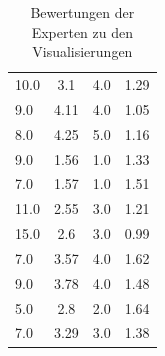 \begin{table}[htbp]
\begin{tabularx}{1.3\textwidth}{|X|c|c|c|}
        10.0 & 3.1 & 4.0 & 1.29 \\
        9.0 & 4.11 & 4.0 & 1.05 \\
        8.0 & 4.25 & 5.0 & 1.16 \\
        9.0 & 1.56 & 1.0 & 1.33 \\
        7.0 & 1.57 & 1.0 & 1.51 \\
        11.0 & 2.55 & 3.0 & 1.21 \\
        15.0 & 2.6 & 3.0 & 0.99 \\
        7.0 & 3.57 & 4.0 & 1.62 \\
        9.0 & 3.78 & 4.0 & 1.48 \\
        5.0 & 2.8 & 2.0 & 1.64 \\
        7.0 & 3.29 & 3.0 & 1.38 \\
 \hline
 \end{tabularx}
 \caption{Bewertungen der Experten zu den Visualisierungen}
 \label{tab:scenario_meta}
\end{table}
